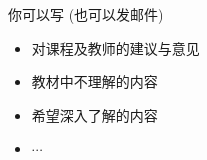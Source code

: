 \documentclass[a4paper, justified]{tufte-handout}
\begin{document}
\begin{solution}
\end{solution}


\begincorrection

\beginfb

你可以写 (也可以发邮件)
\begin{itemize}
  \item 对课程及教师的建议与意见
  \item 教材中不理解的内容
  \item 希望深入了解的内容
  \item $\cdots$
\end{itemize}
\end{document}
